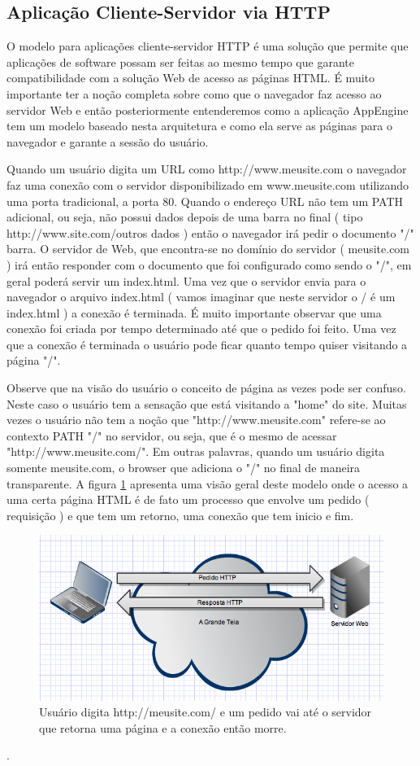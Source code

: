 \documentclass[a4paper]{article}
\begin{document}
 

\subsection {Aplicação Cliente-Servidor via HTTP} 

O modelo para aplicações cliente-servidor HTTP é uma solução que permite que aplicações de software possam ser feitas ao mesmo tempo que garante compatibilidade com a solução Web de acesso as páginas HTML. É muito importante ter a noção completa sobre como que o navegador faz acesso ao servidor Web e então posteriormente entenderemos como a aplicação AppEngine tem um modelo baseado nesta arquitetura e como ela serve as páginas para o navegador e garante a sessão do usuário.  

Quando um usuário digita um URL como http://www.meusite.com o navegador faz uma conexão com o servidor disponibilizado em www.meusite.com utilizando uma porta tradicional, a porta 80. Quando o endereço URL não tem um PATH adicional, ou seja, não possui dados depois de uma barra no final ( tipo http://www.site.com/outros dados ) então o navegador irá pedir o documento "/" barra. O servidor de Web, que encontra-se no domínio do servidor ( meusite.com ) irá então responder com o documento que foi configurado como sendo o "/", em geral poderá servir um index.html. Uma vez que o servidor envia para o navegador o arquivo index.html ( vamos imaginar que neste servidor o / é um index.html ) a conexão é terminada. É muito importante observar que uma conexão foi criada por tempo determinado até que o pedido foi feito. Uma vez que a conexão é terminada o usuário pode ficar quanto tempo quiser visitando a página "/". 

Observe que na visão do usuário o conceito de página as vezes pode ser confuso. Neste caso o usuário tem a sensação que está visitando a "home" do site. Muitas vezes o usuário não tem a noção que "http://www.meusite.com" refere-se ao contexto PATH "/" no servidor, ou seja, que é o mesmo de acessar "http://www.meusite.com/". Em outras palavras, quando um usuário digita somente meusite.com, o browser que adiciona o "/" no final de maneira transparente. A figura \ref{fig:image-cliente-servidor} apresenta uma visão geral deste modelo onde o acesso a uma certa página HTML é de fato um processo que envolve um pedido ( requisição ) e que tem um retorno, uma conexão que tem inicio e fim. 


\begin{figure}[!h]
\centering
\includegraphics[width=4.5in]{image-cliente-servidor.png}
\caption{Usuário digita http://meusite.com/ e um pedido vai até o servidor que retorna uma página e a conexão então morre. }
\label{fig:image-cliente-servidor}
\end{figure}.
\end{document}
